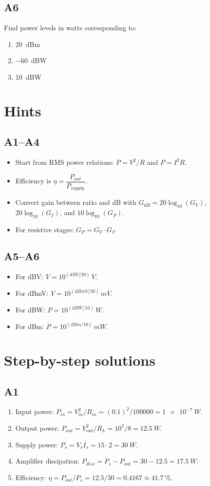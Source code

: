 \documentclass[12pt,a4paper]{article}
\begin{document}
\subsection{A6}
Find power levels in watts corresponding to:
\begin{enumerate}[label=\alph*)]
\item \SI{20}{dBm}
\item \SI{-60}{dBW}
\item \SI{10}{dBW}
\end{enumerate}

\section{Hints}
\subsection{A1--A4}
\begin{itemize}
\item Start from RMS power relations: $P=V^2/R$ and $P=I^2R$.
\item Efficiency is $\eta=\dfrac{P_{out}}{P_{supply}}$.
\item Convert gain between ratio and dB with $G_{dB}=20\log_{10}(G_V)$, $20\log_{10}(G_I)$, and $10\log_{10}(G_P)$.
\item For resistive stages: $G_P=G_V\cdot G_I$.
\end{itemize}

\subsection{A5--A6}
\begin{itemize}
\item For dBV: $V=10^{(dBV/20)}\,\si{V}$.
\item For dBmV: $V=10^{(dBmV/20)}\,\si{mV}$.
\item For dBW: $P=10^{(dBW/10)}\,\si{W}$.
\item For dBm: $P=10^{(dBm/10)}\,\si{mW}$.
\end{itemize}

\section{Step-by-step solutions}
\subsection{A1}
\begin{enumerate}
\item Input power: $P_{in}=V_{in}^2/R_{in}=(0.1)^2/100000=\SI{1e-7}{W}$.
\item Output power: $P_{out}=V_{out}^2/R_L=10^2/8=\SI{12.5}{W}$.
\item Supply power: $P_{s}=V_s I_s=15\cdot2=\SI{30}{W}$.
\item Amplifier dissipation: $P_{diss}=P_s-P_{out}=30-12.5=\SI{17.5}{W}$.
\item Efficiency: $\eta=P_{out}/P_s=12.5/30=0.4167\approx\SI{41.7}{\percent}$.
\end{enumerate}
\end{document}
